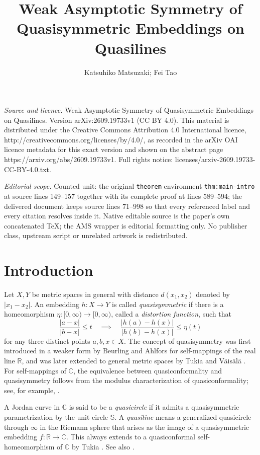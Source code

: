 \documentclass[10pt,a4paper]{amsart}
\numberwithin{equation}{section}
\begin{document}
\title[Weak Asymptotic Symmetry of Quasisymmetric Embeddings on Qua]{Weak Asymptotic Symmetry of Quasisymmetric Embeddings on Quasilines}
\author{Katsuhiko Matsuzaki; Fei Tao}
\date{}
\maketitle
\noindent\emph{Source and licence.} Weak Asymptotic Symmetry of Quasisymmetric Embeddings on Quasilines. Version arXiv:2609.19733v1 (CC BY 4.0). This material is distributed under the Creative Commons Attribution 4.0 International licence, http://creativecommons.org/licenses/by/4.0/, as recorded in the arXiv OAI licence metadata for this exact version and shown on the abstract page https://arxiv.org/abs/2609.19733v1. Full rights notice: licenses/arxiv-2609.19733-CC-BY-4.0.txt.\par\smallskip
\noindent\textit{Editorial scope.} Counted unit: the original \texttt{theorem} environment \texttt{thm:main-intro} at source lines 149--157 together with its complete proof at lines 589--594; the delivered document keeps source lines 71--998 so that every referenced label and every citation resolves inside it. Native editable source is the paper's own concatenated TeX; the AMS wrapper is editorial formatting only. No publisher class, upstream script or unrelated artwork is redistributed.
\section{Introduction}
Let $X,Y$ be metric spaces in general with distance $d(x_1,x_2)$ denoted by $|x_1-x_2|$. 
An embedding $h\colon X\to Y$ is called \emph{quasisymmetric} if there is a homeomorphism $\eta\colon[0,\infty)\to[0,\infty)$, called a \emph{distortion function}, such that
\[
 \frac{|a-x|}{|b-x|}\leq t\quad\implies\quad\frac{|h(a)-h(x)|}{|h(b)-h(x)|}\le\eta(t)
\]
for any three distinct points $a,b,x\in X$. 
The concept of quasisymmetry was first introduced in a weaker form
by Beurling and Ahlfors \cite{BA} for self-mappings of the real line $\mathbb{R}$,
and was later extended to general metric spaces by Tukia and V\"ais\"al\"a \cite{TukiaVaisala}. 
For self-mappings of $\mathbb C$, the equivalence between quasiconformality and quasisymmetry follows from the modulus characterization of quasiconformality; see, for example, \cite{LV71, AIM}. 

A Jordan curve in $\mathbb C$ is said to be a \emph{quasicircle} if 
it admits a quasisymmetric parametrization by the unit circle $\mathbb S$.
A \emph{quasiline} means a generalized quasicircle through $\infty$ in the Riemann sphere that arises as the image of a quasisymmetric embedding $f\colon\mathbb R\to \mathbb{C}$. 
This always extends to a quasiconformal self-homeomorphism of $\mathbb C$ by Tukia \cite{TukiaExtension}.
See also \cite[Proposition~5.10 and Theorem~5.11]{Pom}.
\end{document}
